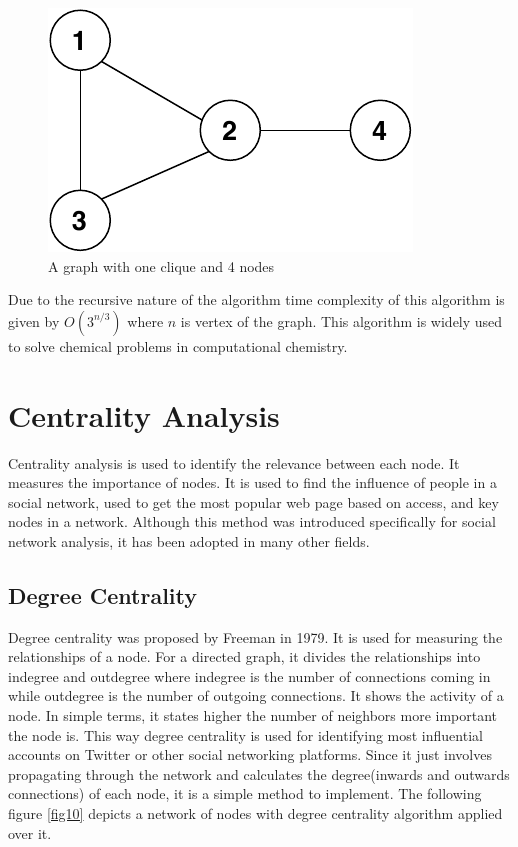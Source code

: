 \documentclass[journal,twoside,web]{ieeecolor}
\begin{document}
\begin{figure}[!h]
    \centerline{\includegraphics[scale=0.8]{figures/bron-kerbosch.pdf}}
    \caption{A graph with one clique and 4 nodes}
    \label{fig9}
\end{figure}

Due to the recursive nature of the algorithm time complexity of this algorithm is given by $O(3^{n/3})$ where $n$ is vertex of the graph. This algorithm is widely used to solve chemical problems in computational chemistry.

\section{Centrality Analysis}
\label{sec:centrality}
Centrality analysis is used to identify the relevance between each node. It measures the importance of nodes. It is used to find the influence of people in a social network, used to get the most popular web page based on access, and key nodes in a network. Although this method was introduced specifically for social network analysis, it has been adopted in many other fields.

\subsection{Degree Centrality}
Degree centrality was proposed by Freeman in 1979\cite{25}. It is used for measuring the relationships of a node. For a directed graph, it divides the relationships into indegree and outdegree where indegree is the number of connections coming in while outdegree is the number of outgoing connections. It shows the activity of a node. In simple terms, it states higher the number of neighbors more important the node is. This way degree centrality is used for identifying most influential accounts on Twitter or other social networking platforms. Since it just involves propagating through the network and calculates the degree(inwards and outwards connections) of each node, it is a simple method to implement. The following figure \ref{fig10} depicts a network of nodes with degree centrality algorithm applied over it.
\end{document}

